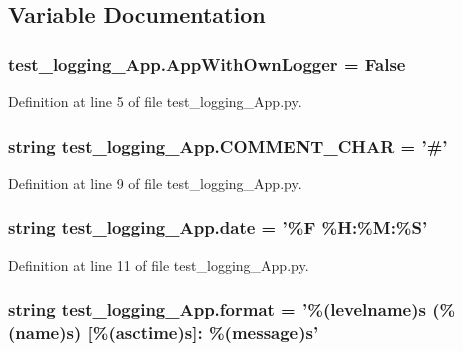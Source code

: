 \subsection{Variable Documentation}
\subsubsection[{App\-With\-Own\-Logger}]{\setlength{\rightskip}{0pt plus 5cm}test\-\_\-logging\-\_\-\-App.\-App\-With\-Own\-Logger = False}\label{namespacetest__logging__App_ac4657730e1d4f00da86f8ae0a58755ee}


Definition at line 5 of file test\-\_\-logging\-\_\-\-App.\-py.

\subsubsection[{C\-O\-M\-M\-E\-N\-T\-\_\-\-C\-H\-A\-R}]{\setlength{\rightskip}{0pt plus 5cm}string test\-\_\-logging\-\_\-\-App.\-C\-O\-M\-M\-E\-N\-T\-\_\-\-C\-H\-A\-R = '\#'}\label{namespacetest__logging__App_a7990af3868da1b720d19dae08fb151ee}


Definition at line 9 of file test\-\_\-logging\-\_\-\-App.\-py.

\subsubsection[{date}]{\setlength{\rightskip}{0pt plus 5cm}string test\-\_\-logging\-\_\-\-App.\-date = '\%F \%H\-:\%M\-:\%S'}\label{namespacetest__logging__App_ac9e5fdf9ce0d042f17cfcfa62f4f1d9e}


Definition at line 11 of file test\-\_\-logging\-\_\-\-App.\-py.

\subsubsection[{format}]{\setlength{\rightskip}{0pt plus 5cm}string test\-\_\-logging\-\_\-\-App.\-format = '\%(levelname)s (\%(name)s) \mbox{[}\%(asctime)s\mbox{]}\-: \%(message)s'}\label{namespacetest__logging__App_a98e4a4b1eaf638f7b38229336efaac0a}


